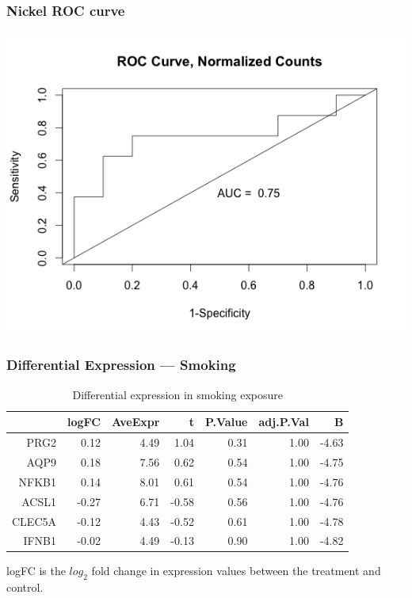 \documentclass{beamer}
\begin{document}
\begin{frame}
	 \frametitle{Nickel ROC curve}
		\centering
	 	\includegraphics[scale=0.45]{../paper/figs/Nickel_ASCL1-APQ9.png} 
\end{frame}


\begin{frame}[fragile]
  	\frametitle{Differential Expression --- Smoking}
 		\begin{table}[ht]
		\caption {Differential expression in smoking exposure} \label{tab:smoking} 
		\centering
		\begin{tabular}{rrrrrrr}
 		 	\hline
 			& logFC & AveExpr & t & P.Value & adj.P.Val & B \\ 
 			 \hline
			PRG2 & 0.12 & 4.49 & 1.04 & 0.31 & 1.00 & -4.63 \\ 
  			AQP9 & 0.18 & 7.56 & 0.62 & 0.54 & 1.00 & -4.75 \\ 
  			NFKB1 & 0.14 & 8.01 & 0.61 & 0.54 & 1.00 & -4.76 \\ 
  			ACSL1 & -0.27 & 6.71 & -0.58 & 0.56 & 1.00 & -4.76 \\ 
  			CLEC5A & -0.12 & 4.43 & -0.52 & 0.61 & 1.00 & -4.78 \\ 
  			IFNB1 & -0.02 & 4.49 & -0.13 & 0.90 & 1.00 & -4.82 \\ 
  			\hline
		\end{tabular}
		\end{table}
		\small logFC is the $log_{2}$ fold change in expression values between the treatment and control.
\end{frame}
\end{document}
